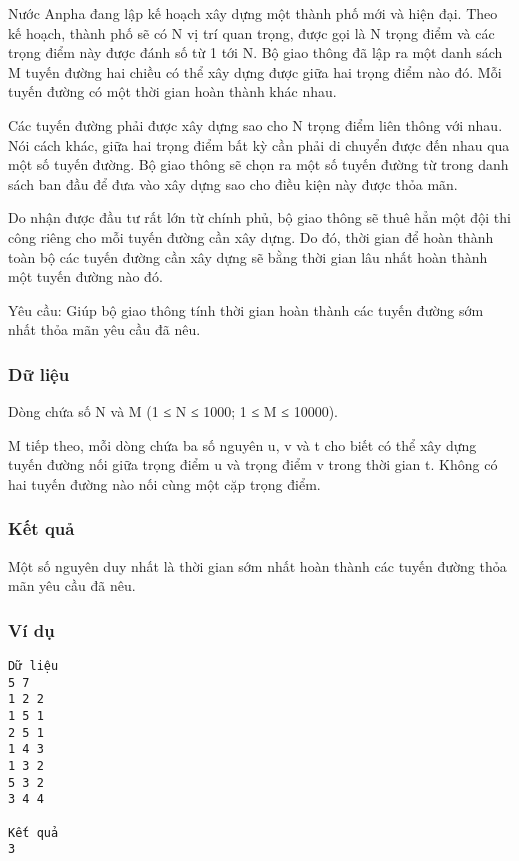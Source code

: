 



   Nước Anpha đang lập kế hoạch xây dựng một thành phố mới và hiện đại. Theo kế hoạch, thành phố sẽ có N vị trí quan trọng, được gọi là N trọng điểm và các trọng điểm này được đánh số từ 1 tới N. Bộ giao thông đã lập ra một danh sách M tuyến đường hai chiều có thể xây dựng được giữa hai trọng điểm nào đó. Mỗi tuyến đường có một thời gian hoàn thành khác nhau.  

   Các tuyến đường phải được xây dựng sao cho N trọng điểm liên thông với nhau. Nói cách khác, giữa hai trọng điểm bất kỳ cần phải di chuyển được đến nhau qua một số tuyến đường. Bộ giao thông sẽ chọn ra một số tuyến đường từ trong danh sách ban đầu để đưa vào xây dựng sao cho điều kiện này được thỏa mãn.  

   Do nhận được đầu tư rất lớn từ chính phủ, bộ giao thông sẽ thuê hẳn một đội thi công riêng cho mỗi tuyến đường cần xây dựng. Do đó, thời gian để hoàn thành toàn bộ các tuyến đường cần xây dựng sẽ bằng thời gian lâu nhất hoàn thành một tuyến đường nào đó.  

   Yêu cầu: Giúp bộ giao thông tính thời gian hoàn thành các tuyến đường sớm nhất thỏa mãn yêu cầu đã nêu.  

\subsubsection{   Dữ liệu  }

   Dòng chứa số N và M (1 ≤ N ≤ 1000; 1 ≤ M ≤ 10000).  

   M tiếp theo, mỗi dòng chứa ba số nguyên u, v và t cho biết có thể xây dựng tuyến đường nối giữa trọng điểm u và trọng điểm v trong thời gian t. Không có hai tuyến đường nào nối cùng một cặp trọng điểm.  

\subsubsection{   Kết quả  }

   Một số nguyên duy nhất là thời gian sớm nhất hoàn thành các tuyến đường thỏa mãn yêu cầu đã nêu.  

\subsubsection{   Ví dụ  }
\begin{verbatim}
Dữ liệu	
5 7
1 2 2
1 5 1
2 5 1
1 4 3
1 3 2
5 3 2
3 4 4	

Kết quả
3
\end{verbatim}